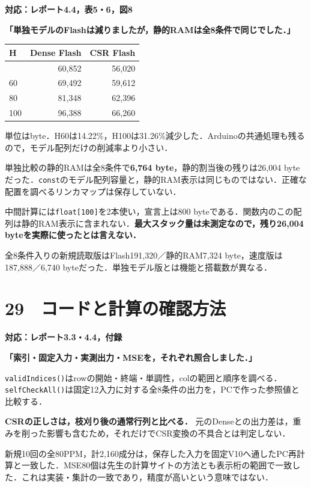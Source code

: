 \documentclass[
  14pt,
  a5paper,
]{extarticle}
\begin{document}
\textbf{対応：レポート4.4，表5・6，図8}

\textbf{「単独モデルのFlashは減りましたが，静的RAMは全8条件で同じでした．」}

\begin{longtable}[]{@{}lrr@{}}
\toprule\noalign{}
H & Dense Flash & CSR Flash \\
\midrule\noalign{}
\endhead
\bottomrule\noalign{}
\endlastfoot
40 & 60,852 & 56,020 \\
60 & 69,492 & 59,612 \\
80 & 81,348 & 62,396 \\
100 & 96,388 & 66,260 \\
\end{longtable}

単位はbyte．H60は14.22\%，H100は31.26\%減少した．Arduinoの共通処理も残るので，モデル配列だけの削減率より小さい．

単独比較の静的RAMは全8条件で\textbf{6,764
byte}，静的割当後の残りは26,004
byteだった．\texttt{const}のモデル配列容量と，静的RAM表示は同じものではない．正確な配置を調べるリンカマップは保存していない．

中間計算には\texttt{float{[}100{]}}を2本使い，宣言上は800
byteである．関数内のこの配列は静的RAM表示に含まれない．\textbf{最大スタック量は未測定なので，残り26,004
byteを実際に使ったとは言えない．}

全8条件入りの新規読取版はFlash191,320／静的RAM7,324
byte，速度版は187,888／6,740
byteだった．単独モデル版とは機能と搭載数が異なる．

\newpage

\section{29　コードと計算の確認方法}\label{ux30b3ux30fcux30c9ux3068ux8a08ux7b97ux306eux78baux8a8dux65b9ux6cd5}

\textbf{対応：レポート3.3・4.4，付録}

\textbf{「索引・固定入力・実測出力・MSEを，それぞれ照合しました．」}

\texttt{validIndices()}はrowの開始・終端・単調性，colの範囲と順序を調べる．\texttt{selfCheckAll()}は固定12入力に対する全8条件の出力を，PCで作った参照値と比較する．

\textbf{CSRの正しさは，枝刈り後の通常行列と比べる．}
元のDenseとの出力差は，重みを削った影響も含むため，それだけでCSR変換の不具合とは判定しない．

新規10回の全80PPM，計2,160成分は，保存した入力を固定V10へ通したPC再計算と一致した．MSE80個は先生の計算サイトの方法とも表示桁の範囲で一致した．これは実装・集計の一致であり，精度が高いという意味ではない．
\end{document}
